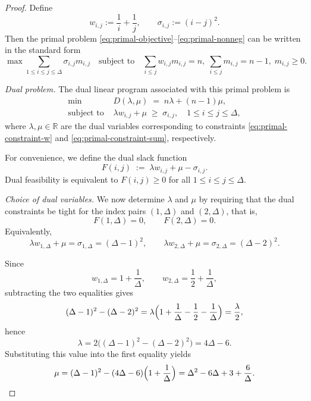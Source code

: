 \documentclass[10pt,a4paper]{amsart}
\begin{document}
\begin{proof}
Define
\[
w_{i,j} := \frac{1}{i}+\frac{1}{j},
\qquad
\sigma_{i,j} := (i-j)^2.
\]
Then the primal problem \eqref{eq:primal-objective}--\eqref{eq:primal-nonneg}
can be written in the standard form
\[
\max \sum_{1\le i\le j\le \Delta} \sigma_{i,j} m_{i,j}
\quad\text{subject to}\quad
\sum_{i\le j} w_{i,j} m_{i,j} = n,\;
\sum_{i\le j} m_{i,j} = n-1,\;
m_{i,j}\ge 0.
\]

\medskip\noindent
\emph{Dual problem.}
The dual linear program associated with this primal problem is
\begin{equation}
\label{eq:dual-problem}
\begin{aligned}
\min\ & D(\lambda,\mu) \;=\; n\lambda + (n-1)\mu,\\
\text{subject to }&
\lambda w_{i,j} + \mu \;\ge\; \sigma_{i,j},
\quad 1\le i\le j\le \Delta,
\end{aligned}
\end{equation}
where $\lambda,\mu\in\mathbb{R}$ are the dual variables corresponding to
constraints \eqref{eq:primal-constraint-w} and \eqref{eq:primal-constraint-sum},
respectively.

For convenience, we define the dual slack function
\begin{equation}
\label{eq:Fij-def}
F(i,j)
\;:=\;
\lambda w_{i,j} + \mu - \sigma_{i,j}.
\end{equation}
Dual feasibility is equivalent to $F(i,j)\ge 0$ for all $1\le i\le j\le \Delta$.

\medskip\noindent
\emph{Choice of dual variables.}
We now determine $\lambda$ and $\mu$ by requiring that the dual constraints
be tight for the index pairs $(1,\Delta)$ and $(2,\Delta)$, that is,
\begin{equation}
\label{eq:dual-equalities-1-2}
F(1,\Delta)=0,
\qquad
F(2,\Delta)=0.
\end{equation}
Equivalently,
\[
\lambda w_{1,\Delta} + \mu = \sigma_{1,\Delta} = (\Delta-1)^2,
\qquad
\lambda w_{2,\Delta} + \mu = \sigma_{2,\Delta} = (\Delta-2)^2.
\]

Since
\[
w_{1,\Delta} = 1+\frac{1}{\Delta},
\qquad
w_{2,\Delta} = \frac12+\frac{1}{\Delta},
\]
subtracting the two equalities gives
\[
(\Delta-1)^2 - (\Delta-2)^2
=
\lambda\Bigl(1+\frac{1}{\Delta}-\frac12-\frac{1}{\Delta}\Bigr)
=
\frac{\lambda}{2},
\]
hence
\begin{equation}
\label{eq:lambda}
\lambda
=
2\bigl((\Delta-1)^2-(\Delta-2)^2\bigr)
=
4\Delta-6.
\end{equation}
Substituting this value into the first equality yields
\begin{equation}
\label{eq:mu}
\mu
=
(\Delta-1)^2 - (4\Delta-6)\Bigl(1+\frac{1}{\Delta}\Bigr)
=
\Delta^2 - 6\Delta + 3 + \frac{6}{\Delta}.
\end{equation}


\end{proof}
\end{document}
